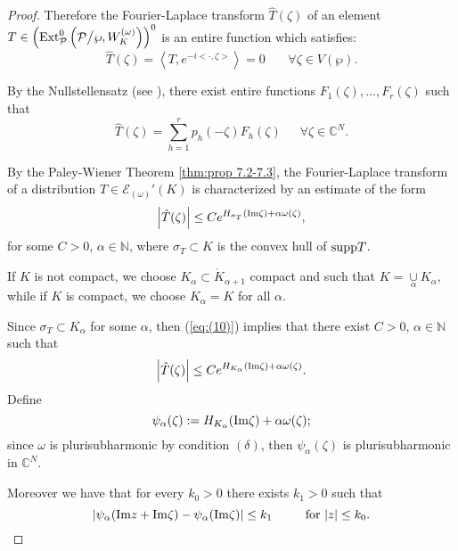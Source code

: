 \documentclass[twoside]{amsart}
\begin{document}
\begin{proof}
Therefore the Fourier-Laplace transform $\hat{T}(\zeta)$ of an element
$T\in\left({\mathop{\rm Ext}\nolimits}_{{\mathcal P}}^{0}\left({\mathcal P}\bigl/\wp,W_{K}^{(\omega)}
\right)\right)^{0}$
is an entire function which satisfies:
\[
\hat{T}(\zeta)=\left\langle T,e^{-i<\cdot,\zeta>}\right\rangle =0
\,\,\,\,\,\,\,\,\,\,\,\forall\zeta\in V(\wp).
\]

By the Nullstellensatz (see \cite{T}), there exist entire functions
$F_{1}(\zeta),\ldots,F_{r}(\zeta)$ such that 
\[
\hat{T}(\zeta)=\sum_{h=1}^{r}p_{h}(-\zeta)F_{h}(\zeta)
\,\,\,\,\,\,\,\,\,\forall\zeta\in\mathbb{C}^{N}.
\]

By the Paley-Wiener Theorem \ref{thm:prop 7.2-7.3}, the Fourier-Laplace
transform of a distribution $T\in{\mathcal{E}}_{(\omega)}'(K)$ is characterized by an
estimate of the form
\begin{equation}
\left|\hat{T}(\zeta)\right|\leq Ce^{H_{\sigma_{T}}({\mathop{\rm Im}\nolimits}\zeta)+\alpha\omega(\zeta)},
\label{eq:(10)}
\end{equation}
for some $C>0$, $\alpha\in{\mathbb N}$,
where $\sigma_{T}\subset K$ is the convex hull of ${\mathop{\rm supp}\nolimits} T$.

If $K$ is not compact, we choose $K_{\alpha}\subset\mathring{K}_{\alpha+1}$
compact and such that $K=\underset{\alpha}{\cup}K_{\alpha}$, while
if $K$ is compact, we choose $K_{\alpha}=K$ for all $\alpha$.

Since $\sigma_{T}\subset K_{\alpha}$ for some $\alpha$, then (\ref{eq:(10)})
implies that there exist $C>0$, $\alpha\in{\mathbb N}$ such that
\begin{equation}
\left|\hat{T}(\zeta)\right|\leq Ce^{H_{K_{\alpha}}({\mathop{\rm Im}\nolimits}\zeta)+\alpha\omega(\zeta)}.
\label{eq:10'}
\end{equation}
Define
\[
\psi_{\alpha}(\zeta):=H_{K_{\alpha}}({\mathop{\rm Im}\nolimits}\zeta)+\alpha\omega(\zeta);
\]
since $\omega$ is plurisubharmonic by condition $(\delta)$, then
$\psi_{\alpha}(\zeta)$ is plurisubharmonic in $\mathbb{C}^{N}$.

Moreover we have that for every $k_{0}>0$ there exists $k_{1}>0$
such that 
\begin{equation}
\left|\psi_{\alpha}({\mathop{\rm Im}\nolimits} z+{\mathop{\rm Im}\nolimits}\zeta)-\psi_{\alpha}({\mathop{\rm Im}\nolimits}\zeta)\right|
\leq k_{1}\,\,\,\,\,\,\,\,\,\,\,\,\,\,\,\,{\rm for}\,\,
|z|\leq k_{0}.
\label{eq:marco}
\end{equation}


\end{proof}
\end{document}

